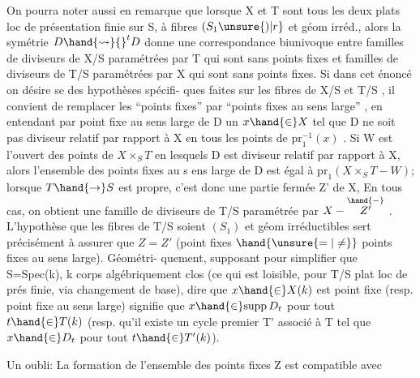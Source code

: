
On pourra noter aussi en remarque que lorsque X et T sont tous les
deux plats loc de présentation finie sur S, à fibres $(S_1\unsure{)|r}$ et géom irréd.,
alors la symétrie $D \hand{\rightsquigarrow} {}^{t}D$ donne une correspondance biunivoque entre
familles de diviseurs de X/S paramétrées par T qui sont sans points fixes
et familles de diviseurs de T/S paramétrées par X qui sont sans points
fixes. Si dans cet énoncé on désire se  des hypothèses spécifi-%
ques faites sur les fibres de X/S et T/S , il convient de remplacer
les ``points fixes'' par ``points fixes au sens large'' , en entendant par
point fixe au sens large de D un $x \hand{\in} X$ tel que D ne soit pas diviseur
 relatif  par rapport à X en tous les points de $\mathrm{pr}_1^{-1}(x)$ . Si W est l'ouvert des
points de $X\times_S T$ en lesquels D est  diviseur  relatif par
rapport à X, alors l'ensemble des points fixes au s ens large de D est
 égal à $\mathrm{pr}_1(X\times_S T - W)$; lorsque $T \hand{\to} S$ est propre, c'est donc
une partie fermée Z' de X,  En tous cas, on obtient une
famille de diviseurs de T/S paramétrée par $X-\overset{\hand{\relbar}}{Z'}$ . L'hypothèse que les
fibres de T/S soient $(S_1)$ et géom irréductibles  sert précisément à
assurer que $Z=Z'$ (point fixes $\hand{\unsure{=|\ne}}$ points fixes au sens large). Géométri-%
quement, supposant pour simplifier que S=Spec(k), k corps algébriquement
clos (ce qui est loisible, pour T/S plat loc de prés finie, via changement de base), dire que $x \hand{\in} X(k)$
est point fixe (resp. point fixe au sens large) signifie que $x \hand{\in} \mathrm{supp}\, D_t$
pour tout $t \hand{\in} T(k)$ (resp. qu'il existe un cycle premier T' associé à T
tel que $x \hand{\in} D_t$ pour tout $t \hand{\in} T'(k)$).

 \placedmargin{$\|$} Un oubli: 
La formation de l'ensemble des points fixes Z est compatible avec

